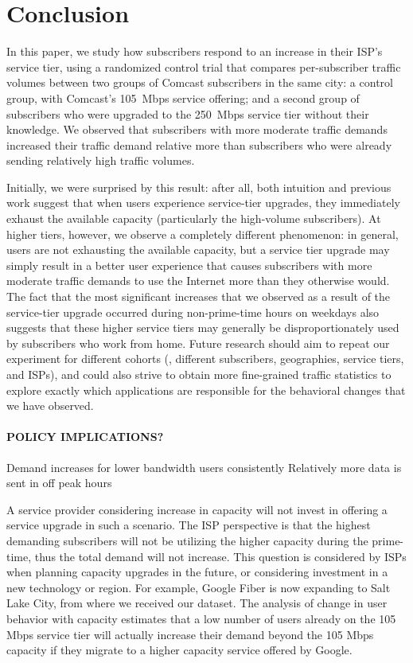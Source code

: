\section{Conclusion}\label{sec:conclusion}

In this paper, we study how subscribers respond to an increase in their
ISP's service tier, using a randomized control trial that compares
per-subscriber traffic volumes between two groups of Comcast subscribers
in the same city: a control group, with Comcast's 105~Mbps service
offering; and a second group of subscribers who were upgraded to the
250~Mbps service tier without their knowledge.  We observed that
subscribers with more moderate traffic demands increased their traffic
demand relative more than subscribers who were already sending
relatively high traffic volumes.  

Initially, we were surprised by this result: after all, both intuition
and previous work suggest that when users experience service-tier
upgrades, they immediately exhaust the available capacity (particularly
the high-volume subscribers). At higher tiers, however, we observe a
completely different phenomenon: in general, users are not exhausting
the available capacity, but a service tier upgrade may simply result in
a better user experience that causes subscribers with more moderate
traffic demands to use the Internet more than they otherwise would.  The
fact that the most significant increases that we observed as a result of
the service-tier upgrade occurred during non-prime-time hours on
weekdays also suggests that these higher service tiers may generally be
disproportionately used by subscribers who work from home.  Future
research should aim to repeat our experiment for different cohorts (\ie,
different subscribers, geographies, service tiers, and ISPs), and could
also strive to obtain more fine-grained traffic statistics to explore
exactly which applications are responsible for the behavioral changes
that we have observed.


\paragraph{POLICY IMPLICATIONS?}

Demand increases for lower bandwidth users consistently
Relatively more data is sent in off peak hours 

A service provider considering increase in 
capacity will not invest in offering a service upgrade in such a scenario. The 
ISP perspective is that the highest demanding subscribers will not be utilizing 
the higher capacity during the prime-time, thus the total demand will not 
increase. This question is considered by ISPs when planning capacity upgrades 
in the future, or considering investment in a new technology or region. For 
example, Google Fiber is now expanding to Salt Lake City, from where 
we received our dataset. The analysis of change in user behavior with capacity 
estimates that a low number of users already on the 105 Mbps service tier will 
actually increase their demand beyond the 105 Mbps capacity if they 
migrate to a higher capacity service offered by Google. 

